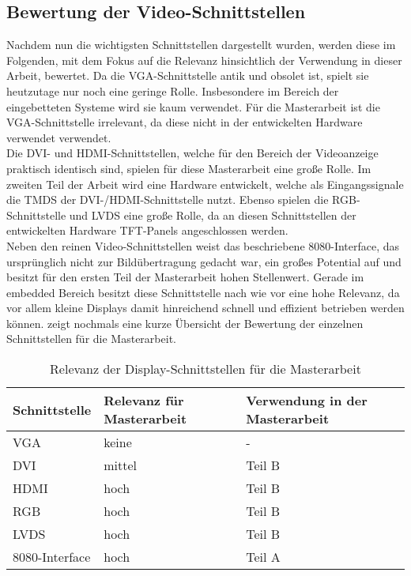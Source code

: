 \subsection{Bewertung der Video-Schnittstellen}
\label{cha:bewertung_video}
Nachdem nun die wichtigsten Schnittstellen dargestellt wurden, werden diese im Folgenden, mit dem Fokus auf die Relevanz hinsichtlich der Verwendung in dieser Arbeit, bewertet.
Da die VGA-Schnittstelle antik und obsolet ist, spielt sie heutzutage nur noch eine geringe Rolle. Insbesondere im Bereich der eingebetteten Systeme wird sie kaum verwendet. Für die Masterarbeit ist die VGA-Schnittstelle irrelevant, da diese nicht in der entwickelten Hardware verwendet verwendet.\\
Die DVI- und HDMI-Schnittstellen, welche für den Bereich der Videoanzeige praktisch identisch sind, spielen für diese Masterarbeit eine große Rolle. Im zweiten Teil der Arbeit wird eine Hardware entwickelt, welche als Eingangssignale die TMDS der DVI-/HDMI-Schnittstelle nutzt. 
Ebenso spielen die RGB-Schnittstelle und LVDS eine große Rolle, da an diesen Schnittstellen der entwickelten Hardware TFT-Panels angeschlossen werden. \\
Neben den reinen Video-Schnittstellen weist das beschriebene 8080-Interface, das ursprünglich nicht zur Bildübertragung gedacht war, ein großes Potential auf und besitzt für den ersten Teil der Masterarbeit hohen Stellenwert. Gerade im embedded Bereich besitzt diese Schnittstelle nach wie vor eine hohe Relevanz, da vor allem kleine Displays damit hinreichend schnell und effizient betrieben werden können.  zeigt nochmals eine kurze Übersicht der Bewertung der einzelnen Schnittstellen für die Masterarbeit.

\begin{table}[h]
\begin{tabular}{|p{3cm}|p{5cm}|p{4.5cm}|}\hline
\rowcolor{TableBackgroundColor}
   \textbf{Schnittstelle} 	& \textbf{Relevanz für Masterarbeit} 	& \textbf{Verwendung in der Masterarbeit}	\\ \hline
   VGA 						& keine  								& - 	 									\\ \hline
   DVI 						& mittel 								& Teil B 									\\ \hline
   HDMI						& hoch 									& Teil B 									\\ \hline
   RGB 						& hoch 									& Teil B 									\\ \hline
   LVDS 					& hoch									& Teil B 									\\ \hline
   8080-Interface 			& hoch 									& Teil A 									\\ \hline
\end{tabular}
\caption{Relevanz der Display-Schnittstellen für die Masterarbeit}
\label{tab:interface_vergleich}
\end{table}

